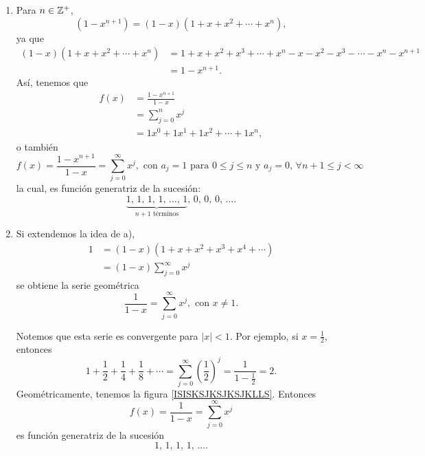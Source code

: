 \begin{myexample}
    \begin{enumerate}[label=\alph*)]
        \item Para $n \in \ZZ[+]$,
        $$\left(1-x^{n+1}\right) = (1-x) \left(1+x+x^2+ \cdots + x^n \right),$$
        ya que
        \begin{align*}
            (1-x) \left(1+x+x^2+ \cdots + x^n \right) & = 1+x+x^2+x^3 + \cdots +x^n - x -x^2 - x^3 - \cdots - x^n - x^{n+1} \\
            & = 1-x^{n+1}.
        \end{align*}
        Así, tenemos que
        \begin{align*}
            f(x) & = \frac{1-x^{n+1}}{1-x} \\
            & = \sum_{j=0}^n x^j \\
            & = 1x^0 + 1x^1 + 1x^2 + \cdots + 1x^n,
        \end{align*}
        o también
        $$f(x) = \frac{1-x^{n+1}}{1-x} = \sum_{j=0}^{\infty} x^j, \text{ con } a_j = 1 \text{ para } 0 \leq j \leq n \text{ y } a_j = 0, \, \forall n+1 \leq j < \infty$$
        la cual, es función generatriz de la sucesión:
        $$\underbrace{1, \, 1, \, 1, \, 1, \, \dots, \, 1}_{n+1 \text{ términos}}, \, 0, \, 0 , \, 0, \, \dots.$$
        \item Si extendemos la idea de a),
        \begin{align*}
            1 & = (1-x)\left(1+x+x^2+x^3+x^4+\cdots\right) \\
            & = (1-x) \sum_{j=0}^{\infty} x^j
        \end{align*}
        se obtiene la serie geométrica
        $$\frac{1}{1-x} = \sum_{j=0}^{\infty}x^j, \text{ con } x \neq 1.$$
        \begin{minipage}[c]{0.52\textwidth}
            Notemos que esta serie es convergente para $|x| < 1$. Por ejemplo, si $\displaystyle x = \frac{1}{2}$, entonces
            $$1+\frac{1}{2}+\frac{1}{4}+\frac{1}{8}+\cdots=\sum_{j=0}^{\infty} \left( \frac{1}{2} \right)^j = \frac{1}{\displaystyle 1-\frac{1}{2}} = 2.$$
            Geométricamente, tenemos la figura \ref{ISISKSJKSJKSJKLLS}. Entonces
            \begin{equation}
                f(x) = \frac{1}{1-x} = \sum_{j=0}^{\infty} x^j \label{HJFDFDHGHGHFUHUGFH}
            \end{equation}
            es función generatriz de la sucesión
        $$1, \, 1, \, 1, \, 1, \, \dots.$$
        \end{minipage}~

\end{enumerate}
\end{myexample}
